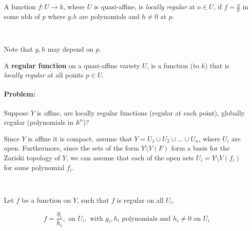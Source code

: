 \begin{definition}
    A function $f\colon U\rightarrow k$, where $U$ is quasi-affine, is \textit{locally regular} at $o\in U$, if $f = \frac{g}{h}$ in some nbh of $p$ where $g.h$ are polynomials and $h\neq 0$ at $p$.
    
    \

    Note that $g,h$ may depend on $p$.
\end{definition}


\begin{definition}\label{regular function}
    A \textbf{regular function} on a quasi-affine variety $U$, is a function (to $k$) that is \textit{locally regular} at all points $p\in U$.
\end{definition}

\paragraph*{Problem:} Suppose $Y$ is affine, are locally regular functions (regular at each point), globally regular (polynomials in $\mathbb{A}^n$)?

Since $Y$ is affine it is compact, assume that $Y = U_1\cup U_2\cup\ldots\cup U_n$, where $U_i$ are open. Furthermore, since the sets of the form $Y\setminus V(F)$ form a basis for the Zariski topology of $Y$, we can assume that each of the open sets $U_i = Y\setminus V(f_i)$ for some polynomial $f_i$. 

\

Let $f$ be a function on $Y$, such that $f$ is regular on all $U_i$.

\[f = \frac{g_i}{h_i}, \text{ on }U_i, \text{ with }g_i,h_i\text{ polynomials and }h_i\neq 0 \text{ on }U_i\]


